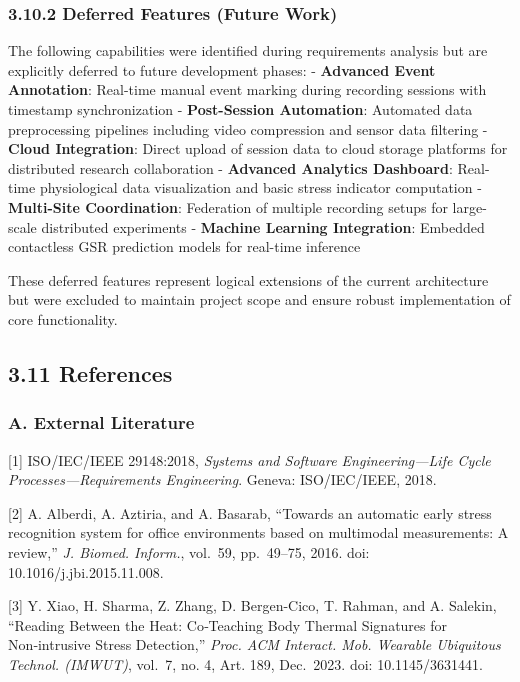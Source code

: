 \documentclass[12pt,a4paper]{article}
\begin{document}
\subsubsection{3.10.2 Deferred Features (Future Work)}\label{deferred-features-future-work}

The following capabilities were identified during requirements analysis but are explicitly deferred to future development phases: - \textbf{Advanced Event Annotation}: Real-time manual event marking during recording sessions with timestamp synchronization - \textbf{Post-Session Automation}: Automated data preprocessing pipelines including video compression and sensor data filtering - \textbf{Cloud Integration}: Direct upload of session data to cloud storage platforms for distributed research collaboration - \textbf{Advanced Analytics Dashboard}: Real-time physiological data visualization and basic stress indicator computation - \textbf{Multi-Site Coordination}: Federation of multiple recording setups for large-scale distributed experiments - \textbf{Machine Learning Integration}: Embedded contactless GSR prediction models for real-time inference

These deferred features represent logical extensions of the current architecture but were excluded to maintain project scope and ensure robust implementation of core functionality.

\subsection{3.11 References}\label{references}

\subsubsection{A. External Literature}\label{a.-external-literature}

{[}1{]} ISO/IEC/IEEE 29148:2018, \emph{Systems and Software Engineering---Life Cycle Processes---Requirements Engineering}. Geneva: ISO/IEC/IEEE, 2018.

{[}2{]} A. Alberdi, A. Aztiria, and A. Basarab, ``Towards an automatic early stress recognition system for office environments based on multimodal measurements: A review,'' \emph{J. Biomed. Inform.}, vol.~59, pp.~49--75, 2016. doi: 10.1016/j.jbi.2015.11.008.

{[}3{]} Y. Xiao, H. Sharma, Z. Zhang, D. Bergen-Cico, T. Rahman, and A. Salekin, ``Reading Between the Heat: Co‑Teaching Body Thermal Signatures for Non‑intrusive Stress Detection,'' \emph{Proc. ACM Interact. Mob. Wearable Ubiquitous Technol. (IMWUT)}, vol.~7, no. 4, Art. 189, Dec.~2023. doi: 10.1145/3631441.
\end{document}
